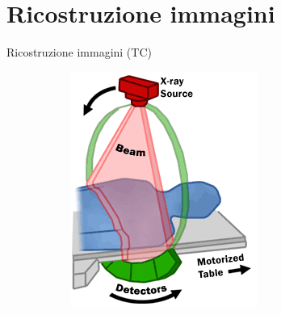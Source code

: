 \documentclass{beamer}
\begin{document}
	\section{Ricostruzione immagini}
	\begin{frame}{Ricostruzione immagini (TC)}	
	
	\begin{figure}
		\centering
		\begin{subfigure}{.4\textwidth}
  			\centering
  			\includegraphics[width=1\linewidth]{Images/CTBeam.png}
		\end{subfigure}
		\begin{subfigure}{.4\textwidth}
  			\centering

\end{subfigure}
\end{figure}
\end{frame}
\end{document}
